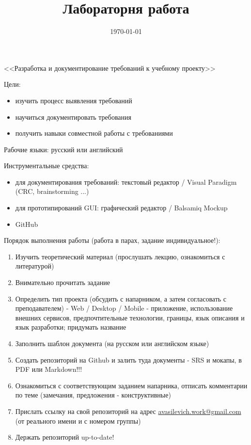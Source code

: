 \documentclass[12pt, a4paper]{article}
\begin{document}
\singlespacing

\title{Лабораторня работа }
\date{\normalsize \today}
\maketitle

\noindent
<<Разработка и документирование требований к учебному проекту>> \newline

\noindent
Цели:
\begin{itemize} \itemsep0em
    \item изучить процесс выявления требований
    \item научиться документировать требования
    \item получить навыки совместной работы с требованиями
\end{itemize}

\noindent
Рабочие языки: русский или английский  \newline

\noindent
Инструментальные средства:
\begin{itemize} \itemsep0em
    \item для документирования требований: текстовый редактор / Visual Paradigm (CRC, brainstorming ...)
    \item для прототипирований GUI: графический редактор / Balsamiq Mockup
    \item GitHub
\end{itemize}

\noindent
Порядок выполнения работы (работа в парах, задание индивидуальное!):
\begin{enumerate} \itemsep0em
    \item Изучить теоретический материал (прослушать лекцию, ознакомиться с литературой)
    \item Внимательно прочитать задание
    \item Определить тип проекта (обсудить с напарником, а затем согласовать с преподавателем) - Web / Desktop / Mobile - приложение,
          использование внешних сервисов, предпочтительные технологии, границы, язык описания и язык разработки;
          придумать название
    \item Заполнить шаблон документа (на русском или английском языке)
    \item Создать репозиторий на Github и залить туда документы - SRS и мокапы, в PDF или Markdown!!!
    \item Ознакомиться с соответствующим заданием напарника, отписать
          комментарии по теме (замечания, предложения - конструктивные)
    \item Прислать ссылку на свой репозиторий на адрес \href{mailto:avasilevich.work@gmail.com}{avasilevich.work@gmail.com}
          (от реального имени и с номером группы)
    \item Держать репозиторий up-to-date!
\end{enumerate}
\end{document}
